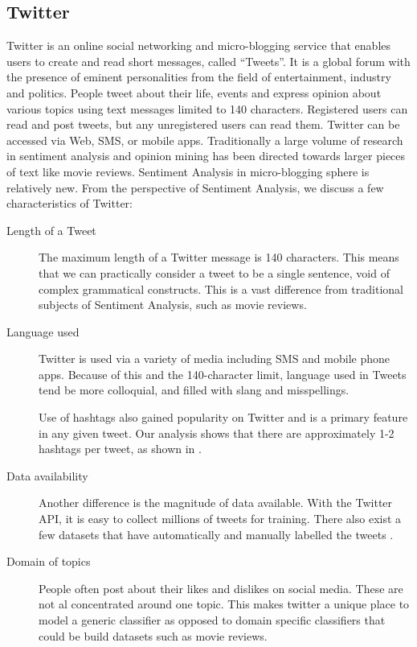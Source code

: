 \subsection{Twitter} Twitter is an online social networking and micro-blogging
service that enables users to create and read short messages, called ``Tweets''.
It is a global forum with the presence of eminent personalities from the
field of entertainment, industry and politics. People tweet about their life,
events and express opinion about various topics using text messages limited to
140 characters. Registered users can read and post tweets, but any unregistered
users can read them. Twitter can be accessed via Web, SMS, or mobile apps.
Traditionally a large volume of research in sentiment analysis and opinion
mining has been directed towards larger pieces of text like movie reviews.
Sentiment Analysis in micro-blogging sphere is relatively new. From the
perspective of Sentiment Analysis, we discuss a few characteristics of Twitter:

\begin{description}

\item[Length of a Tweet]{ The maximum length of a Twitter message is 140
characters. This means that we can practically consider a tweet to be a single
sentence, void of complex grammatical constructs. This is a vast difference from
traditional subjects of Sentiment Analysis, such as movie reviews. }

\item[Language used]{ Twitter is used via a variety of media including SMS and
mobile phone apps. Because of this and the 140-character limit, language used in
Tweets tend be more colloquial, and filled with slang and misspellings.
 Use of
hashtags also gained popularity on Twitter and is a primary feature in any given
tweet. Our analysis shows that there are approximately 1-2 hashtags per tweet, as
shown in . }

\item[Data availability]{ Another difference is the magnitude of data available.
With the Twitter API, it is easy to collect millions of tweets for training. There
also exist a few datasets that have automatically and manually labelled the tweets
\cite{GBH} \cite{San}. }

\item[Domain of topics]{ People often post about their likes and dislikes on social
media. These are not al concentrated around one topic. This makes twitter a unique
place to model a generic classifier as opposed to domain specific classifiers that
could be build datasets such as movie reviews. }

\end{description}
